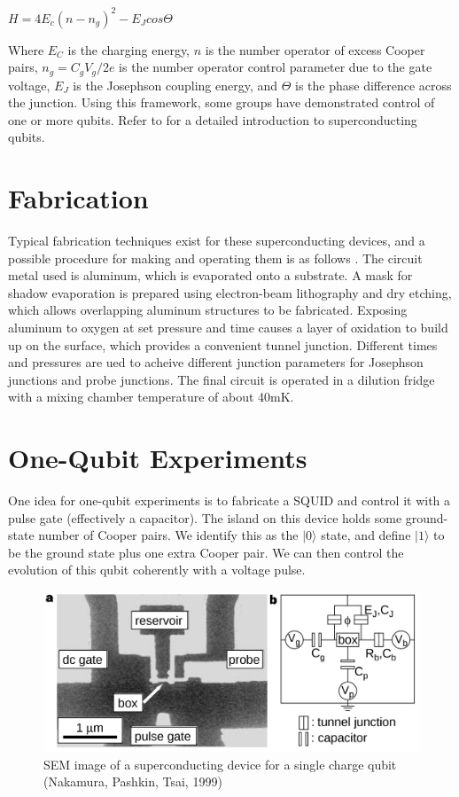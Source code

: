 \documentclass[12pt,letterpaper,notitlepage]{report}
\begin{document}
$H=4E_c(n-n_g)^2-E_Jcos\Theta$

Where $E_C$ is the charging energy, $n$ is the number operator of excess Cooper pairs, $n_g=C_gV_g/2e$ is the number operator control parameter due to the gate voltage, $E_J$ is the Josephson coupling energy, and $\Theta$ is the phase difference across the junction. Using this framework, some groups have demonstrated control of one or more qubits. Refer to \cite{reviewPaper} for a detailed introduction to superconducting qubits.

%
%

\section*{Fabrication}

Typical fabrication techniques exist for these superconducting devices, and a possible procedure for making and operating them is as follows \cite{onePulseGatePhysica}. The circuit metal used is aluminum, which is evaporated onto a substrate. A mask for shadow evaporation is prepared using electron-beam lithography and dry etching, which allows overlapping aluminum structures to be fabricated. Exposing aluminum to oxygen at set pressure and time causes a layer of oxidation to build up on the surface, which provides a convenient tunnel junction. Different times and pressures are ued to acheive different junction parameters for Josephson junctions and probe junctions. The final circuit is operated in a dilution fridge with a mixing chamber temperature of about 40mK.

%
%

\section*{One-Qubit Experiments}

One idea for one-qubit experiments is to fabricate a SQUID and control it with a pulse gate (effectively a capacitor). The island on this device holds some ground-state number of Cooper pairs. We identify this as the $|0\rangle$ state, and define $|1\rangle$ to be the ground state plus one extra Cooper pair. We can then control the evolution of this qubit coherently with a voltage pulse.

\begin{figure}[ht]
    \centering
    \includegraphics[width=\textwidth]{img/nakamura-single-cpb.jpg}
    \caption{SEM image of a superconducting device for a single charge qubit (Nakamura, Pashkin, Tsai, 1999) \cite{singleCPB}}
\end{figure}
\end{document}
